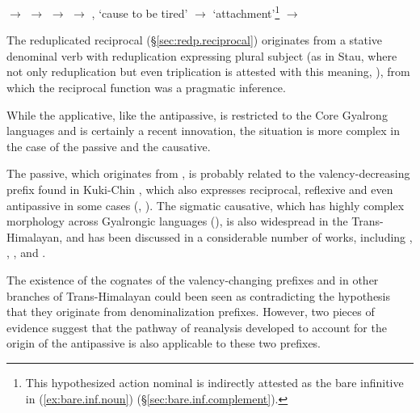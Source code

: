  \begin{exe}
 \ex \label{ex:pathways.denom}
  \begin{xlist}
\ex \label{ex:nWGmu.pathway}
\glt  {} $\rightarrow$  $\rightarrow$   
\ex \label{ex:sWGYat.pathway}
\glt  {} $\rightarrow$  $\rightarrow$ , `cause to be tired'  
\ex \label{ex:atshoR.pathway}
\glt  {}$\rightarrow$  `attachment'\footnote{This hypothesized action nominal is indirectly attested as the bare infinitive in (\ref{ex:bare.inf.noun}) (§\ref{sec:bare.inf.complement}). } $\rightarrow$ 
\end{xlist}
\end{exe}

The reduplicated reciprocal (§\ref{sec:redp.reciprocal}) originates from a stative denominal verb with reduplication expressing plural subject (as in Stau, where not only reduplication but even triplication is attested with this meaning, \citealt{gates17triplication}), from which the reciprocal function was a pragmatic inference.

While the applicative, like the antipassive, is restricted to the Core Gyalrong languages and is certainly a recent innovation, the situation is more complex in the case of the passive and the causative.

The  passive, which originates from , is probably related to the valency-decreasing  prefix found in Kuki-Chin \citep{jacques07passif}, which also expresses reciprocal, reflexive and even antipassive in some cases (\citealt[203--209]{hartmann09grammar}, \citealt[57]{mang06kcho}). The sigmatic causative, which has highly complex morphology across Gyalrongic languages (\citealt{jackson07shangzhai, lai16caus}), is also widespread in the Trans-Himalayan, and has been discussed in a considerable number of works, including \citet{conrady1896}, \citet{sagart12sprefix}, \citet{mei12caus}, \citet{handel12valence} and \citet{jacques15causative}.

The existence of the cognates of the valency-changing prefixes   and  in other branches of Trans-Himalayan could been seen as contradicting the hypothesis that they originate from denominalization prefixes. However, two pieces of evidence suggest that the pathway of reanalysis developed to account for the origin of the antipassive is also applicable to these two prefixes.

